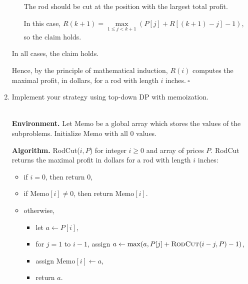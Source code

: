 \begin{enumerate}
\begin{solution}
\begin{itemize}
The rod should be cut at the position with the largest total profit.
 
In this case, $R(k+1)=\underset{1\leq j<k+1}{\max}\left(P[j]+R[(k+1)-j]-1\right)$, so the claim holds.
\end{itemize}
In all cases, the claim holds.

Hence, by the principle of mathematical induction, $R(i)$ computes the maximal profit, in dollars, for a rod with length $i$ inches.$~\square$
\end{solution}
\item Implement your strategy using top-down DP with memoization.
\begin{solution}\\

\textbf{Environment. }Let {\sc Memo} be a global array which stores the values of the subproblems. Initialize {\sc Memo} with all $0$ values.

\textbf{Algorithm. }{\sc RodCut}($i,P$) for integer $i\geq 0$ and array of prices $P$. {\sc RodCut} returns the maximal profit in dollars for a rod with length $i$ inches:
\begin{itemize}
\item if $i=0$, then return $0$,
\item if {\sc Memo}$[i]\neq 0$, then return {\sc Memo}$[i]$.
\item otherwise,
\begin{itemize}
\item let $a\leftarrow P[i]$,
\item for $j=1$ to $i-1$, assign $a\leftarrow \max(a,P[j]+\textsc{RodCut}(i-j,P)-1)$,
\item assign {\sc Memo}$[i]\leftarrow a$,
\item return $a$.
\end{itemize}
\end{itemize}
\end{solution}
\end{enumerate} 

